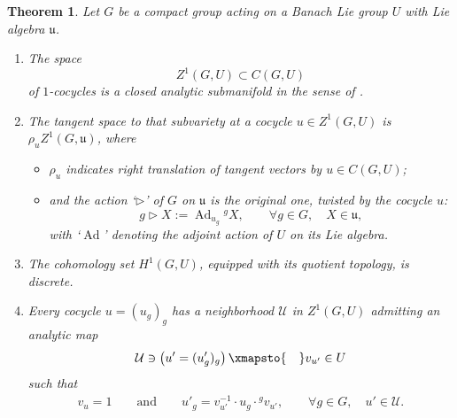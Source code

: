 \documentclass[10pt,a4paper]{amsart}
\numberwithin{equation}{section}
\newtheorem{Theorem}{Theorem}[section]
\newcommand\cU{{\mathcal U}}
\newcommand\fu{{\mathfrak u}}
\begin{document}
\begin{Theorem}\label{th:cocyle-man-1}
 Let $G$ be a compact group acting on a Banach Lie group $U$ with Lie algebra $\fu$.
 \begin{enumerate}[$(1)$]\itemsep=0pt
 \item\label{item:cocyle-man-1} The space
 \begin{equation*}
 Z^1(G,U)\subset C(G,U)
 \end{equation*}
 of $1$-cocycles is a closed analytic submanifold in the sense of {\rm \cite[\emph{Section}~5.8.3]{bourb-vars-17}}.

 \item\label{item:cocyle-man-1-tgz1} The tangent space to that subvariety at a cocycle $u\in Z^1(G,U)$ is $\rho_{u} Z^1(G,\fu)$, where
 \begin{itemize}\itemsep=0pt
 \item $\rho_{u}$ indicates right translation of tangent vectors by ${u}\in C(G,U)$;
 \item and the action `$\triangleright$' of $G$ on $\fu$ is the original one, twisted by the cocycle ${u}$:
 \begin{equation}\label{eq:defact}
 g\triangleright X:=\operatorname{Ad}_{u_g} {}^g X,\qquad \forall g\in G,\quad X\in \fu,
 \end{equation}
 with `$\operatorname{Ad}$' denoting the adjoint action of $U$ on its Lie algebra.
 \end{itemize}

 \item\label{item:cocyle-man-1-h1disc} The cohomology set $H^1(G,U)$, equipped with its quotient topology, is discrete.

\item\label{item:cocyle-man-1-coboundsplit} Every cocycle $u=(u_g)_g$ has a neighborhood $\cU$ in $Z^1(G,U)$ admitting an analytic map
 \begin{equation*}
 \cU\ni \left({u'}=(u'_g)_g\right)\xmapsto{\quad} v_{u'}\in U
 \end{equation*}
 such that
 \begin{align*}
 v_{u} =1\qquad\text{and}\qquad
 u'_g =v_{u'}^{-1}\cdot u_g\cdot {}^gv_{u'},\qquad \forall g\in G,\quad u'\in \cU.
 \end{align*}
 \end{enumerate}
\end{Theorem}
\end{document}
